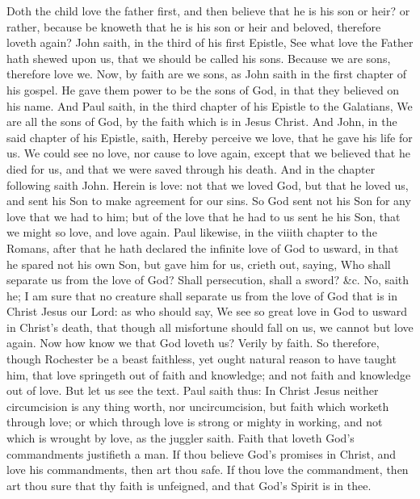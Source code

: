 Doth the child love the father first, and then believe that 
he is his son or heir? or rather, because be knoweth that 
he is his son or heir and beloved, therefore loveth again? 
John saith, in the third of his first Epistle, See what love 
the Father hath shewed upon us, that we should be called
his sons. Because we are sons, therefore love we. Now, 
by faith are we sons, as John saith in the first chapter of 
his gospel. He gave them power to be the sons of God, 
in that they believed on his name. And Paul saith, in 
the third chapter of his Epistle to the Galatians, We are 
all the sons of God, by the faith which is in Jesus Christ. 
And John, in the said chapter of his Epistle, saith, Hereby 
perceive we love, that he gave his life for us. We could 
see no love, nor cause to love again, except that we believed
that he died for us, and that we were saved through 
his death. And in the chapter following saith John. 
Herein is love: not that we loved God, but that he loved 
us, and sent his Son to make agreement for our sins. So 
God sent not his Son for any love that we had to him; 
but of the love that he had to us sent he his Son, that we 
might so love, and love again. Paul likewise, in the 
viiith chapter to the Romans, after that he hath declared 
the infinite love of God to usward, in that he spared not 
his own Son, but gave him for us, crieth out, saying, Who 
shall separate us from the love of God? Shall persecution,
shall a sword? \&c. No, saith he; I am sure that 
no creature shall separate us from the love of God 
that is in Christ Jesus our Lord: as who should say, 
We see so great love in God to usward in Christ's 
death, that though all misfortune should fall on us, we
cannot but love again. Now how know we that God 
loveth us? Verily by faith. So therefore, though Rochester
be a beast faithless, yet ought natural reason to
have taught him, that love springeth out of faith and 
knowledge; and not faith and knowledge out of love. 
But let us see the text. Paul saith thus: In Christ Jesus 
neither circumcision is any thing worth, nor uncircumcision, 
but faith which worketh through love; or which through 
love is strong or mighty in working, and not which is 
wrought by love, as the juggler saith. Faith that loveth 
God's commandments justifieth a man. If thou believe 
God's promises in Christ, and love his commandments, 
then art thou safe. If thou love the commandment, then 
art thou sure that thy faith is unfeigned, and that God's 
Spirit is in thee. 

